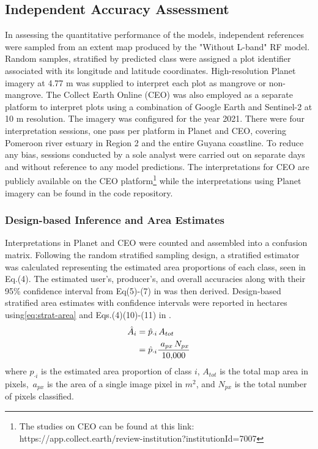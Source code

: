 \documentclass[final-report]{report-template}
\begin{document}
\subsection{Independent Accuracy Assessment}
In assessing the quantitative performance of the models, independent references were sampled from an extent map produced by the "Without L-band" RF model. Random samples, stratified by predicted class were assigned a plot identifier associated with its longitude and latitude coordinates. High-resolution Planet imagery at 4.77 m was supplied to interpret each plot as mangrove or non-mangrove. The Collect Earth Online (CEO) was also employed as a separate platform to interpret plots using a combination of Google Earth and Sentinel-2 at 10 m resolution.  The imagery was configured for the year 2021. There were four interpretation sessions, one pass per platform in Planet and CEO, covering Pomeroon river estuary in Region 2 and the entire Guyana coastline. To reduce any bias, sessions conducted by a sole analyst were carried out on separate days and without reference to any model predictions. The interpretations for CEO are publicly available on the CEO platform\footnote{The studies on CEO can be found at this link: https://app.collect.earth/review-institution?institutionId=7007} while the interpretations using Planet imagery can be found in the code repository. 

\subsubsection{Design-based Inference and Area Estimates}
Interpretations in Planet and CEO were counted and assembled into a confusion matrix. Following the \textcite{Olofsson2014} random stratified sampling design, a stratified estimator was calculated representing the estimated area proportions of each class, seen in Eq.(4). The estimated user's, producer's, and overall accuracies along with their 95\% confidence interval from Eq(5)-(7) in \textcite{Olofsson2014} was then derived. Design-based stratified area estimates with confidence intervals were reported in hectares using\eqref{eq:strat-area} and Eqs.(4)(10)-(11) in \textcite{Olofsson2014}. 
\begin{align}
    \hat A_i &= \hat p_{\cdot i }\, A_{tot} \notag \\
             &=\hat p_{\cdot i}\frac{\;a_{px}\, N_{px}}{10{,}000}
    \label{eq:strat-area}
\end{align}
where $\hat p_{\cdot i }$ is the estimated area proportion of class $i$, $A_{tot}$ is the total map area in pixels, $\,a_{px}$ is the area of a single image pixel in $m^2$,  and $N_{px}$ is the total number of pixels classified. \\
\end{document}
